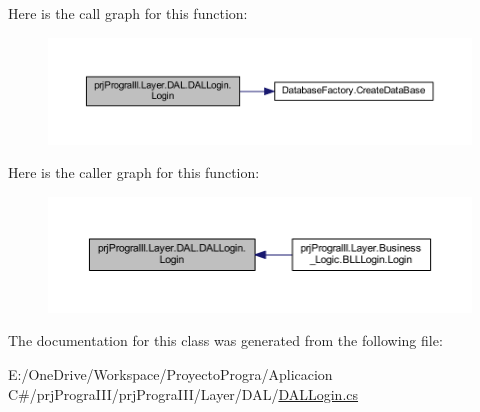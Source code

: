 Here is the call graph for this function\+:
\nopagebreak
\begin{figure}[H]
\begin{center}
\leavevmode
\includegraphics[width=350pt]{classprj_progra_i_i_i_1_1_layer_1_1_d_a_l_1_1_d_a_l_login_a2c7ffe6eec7104cf55cb7e7b63ba1ce1_cgraph}
\end{center}
\end{figure}
Here is the caller graph for this function\+:
\nopagebreak
\begin{figure}[H]
\begin{center}
\leavevmode
\includegraphics[width=350pt]{classprj_progra_i_i_i_1_1_layer_1_1_d_a_l_1_1_d_a_l_login_a2c7ffe6eec7104cf55cb7e7b63ba1ce1_icgraph}
\end{center}
\end{figure}


The documentation for this class was generated from the following file\+:\begin{DoxyCompactItemize}
\item 
E\+:/\+One\+Drive/\+Workspace/\+Proyecto\+Progra/\+Aplicacion C\#/prj\+Progra\+I\+I\+I/prj\+Progra\+I\+I\+I/\+Layer/\+D\+A\+L/\hyperlink{_d_a_l_login_8cs}{D\+A\+L\+Login.\+cs}\end{DoxyCompactItemize}
